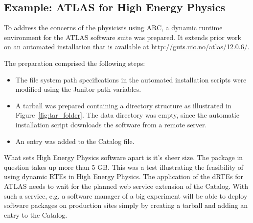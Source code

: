 
\subsection{Example: ATLAS for High Energy Physics}

To address the concerns of the physicists using ARC, a dynamic runtime
environment for the ATLAS software suite was prepared. It extends prior
work on an automated installation that is available at
\href{http://guts.uio.no/atlas/12.0.6/}{http://guts.uio.no/atlas/12.0.6/}.

The preparation comprised the following steps:
\begin{itemize}
    \item The file system path specifications in the automated
       installation scripts were modified using the Janitor
       path variables.
    \item A tarball was prepared containing a directory structure as
       illustrated in Figure~\ref{fig:tar_folder}. The data directory
       was empty, since the automatic installation script downloads the
       software from a remote server.
    \item An entry was added to the Catalog file.
\end{itemize}

What sets High Energy Physics software apart is it's sheer size. The
package in question takes up more than 5 GB. This was a test illustrating
the feasibility of using dynamic RTEs in High Energy Physics. The
application of the dRTEs for ATLAS needs to wait for the planned web
service extension of the Catalog. With such a service, e.g. a software
manager of a big experiment will be able to deploy software packages
on production sites simply by creating a tarball and adding an entry to
the Catalog.

